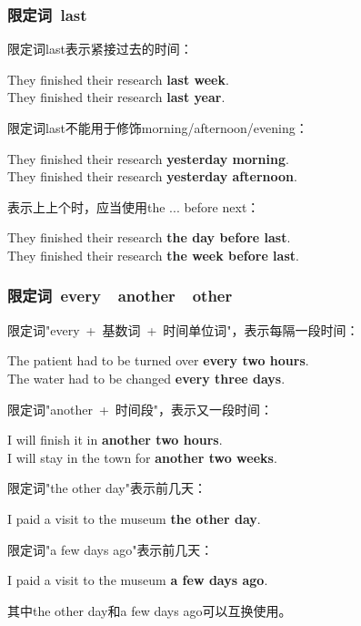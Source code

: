 \documentclass[UTF8]{ctexart}
\newcommand{\littf}[1]{{\hspace{3pt}\ttfamily #1}}
\begin{document}
\subsubsection{限定词~\littf{last}}
    限定词\littf{last}表示紧接过去的时间：
    \begin{center}
        \large\ttfamily
        They finished their research \textbf{last week}.\\[3mm]
        They finished their research \textbf{last year}.\\[6mm]
    \end{center}
    限定词\littf{last}不能用于修饰\littf{morning/afternoon/evening}：
    \begin{center}
        \large\ttfamily
        They finished their research \textbf{yesterday morning}.\\[3mm]
        They finished their research \textbf{yesterday afternoon}.\\[6mm]
    \end{center}
    表示上上个时，应当使用\littf{the ... before next}：
    \begin{center}
        \large\ttfamily
        They finished their research \textbf{the day before last}.\\[3mm]
        They finished their research \textbf{the week before last}.
    \end{center}\vspace{15pt}

\subsubsection{限定词~\littf{every}~~\littf{another}~~\littf{other}}
    限定词\littf{"every~+~基数词~+~时间单位词"}，表示每隔一段时间：
    \begin{center}
        \large\ttfamily
        The patient had to be turned over \textbf{every two hours}.\\[3mm]
        The water had to be changed \textbf{every three days}.\\[6mm]
    \end{center}
    限定词\littf{"another~+~时间段"}，表示又一段时间：
    \begin{center}
        \large\ttfamily
        I will finish it in \textbf{another two hours}.\\[3mm]
        I will stay in the town for \textbf{another two weeks}.\\[6mm]
    \end{center}
    限定词\littf{"the other day"}表示前几天：
    \begin{center}
        \large\ttfamily
        I paid a visit to the museum \textbf{the other day}.\\[6mm]
    \end{center}
    限定词\littf{"a few days ago"}表示前几天：
    \begin{center}
        \large\ttfamily
        I paid a visit to the museum \textbf{a few days ago}.\\[6mm]
    \end{center}
    其中\littf{the other day}和\littf{a few days ago}可以互换使用。
\end{document}
